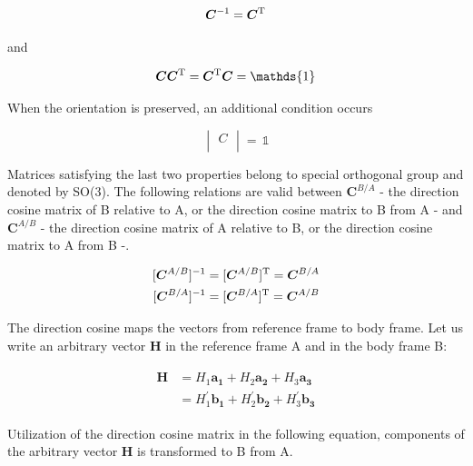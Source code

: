 \begin{equation}
\label{eqn:orthonormality}
\bm{C}^{-1} = \bm{C}^{\rm T}
\end{equation}

and

\begin{equation}
\label{eqn:orthonormality2}
\bm{C}\bm{C}^{\rm T} = \bm{C}^{\rm T}\bm{C} = \mathds{1}
\end{equation}

When the orientation is preserved, an additional condition occurs

\begin{equation}
\label{eqn:noRotation}
\begin{vmatrix}
C\\[0.01em]
\end{vmatrix}
=\,
\mathds{1}
\end{equation}

Matrices satisfying the last two properties belong to special orthogonal group and denoted by SO(3). 
The following relations are valid between $\bm{C}^{B/A}$ - the direction cosine matrix of B relative to A, or the direction cosine matrix to B from A - and $\bm{C}^{A/B}$ - the direction cosine matrix of A relative to B, or the direction cosine matrix to A from B -.

\begin{align}
\label{eqn:C_B_A_vs_C_A_B}
\begin{split}
[\bm{C}^{A/B}]^{-1} = [\bm{C}^{A/B}]^{\rm T} = \bm{C}^{B/A} 
\\
[\bm{C}^{B/A}]^{-1} = [\bm{C}^{B/A}]^{\rm T} = \bm{C}^{A/B}
\end{split}
\end{align}

The direction cosine maps the vectors from reference frame to body frame.  
Let us write an arbitrary vector $\bm{H}$ in the reference frame A and in the body frame B:

\begin{align}
\label{eqn:vectorInRefFrame}
\begin{split}
\bm{H} & = H_1 \bm{a_1} + H_2 \bm{a_2} + H_3 \bm{a_3}
\\
& = H_1^{'} \bm{b_1} + H_2^{'} \bm{b_2} + H_3^{'} \bm{b_3}
\end{split}
\end{align}

Utilization of the direction cosine matrix in the following equation, components of the arbitrary vector $\bm{H}$ is transformed to B from A.

